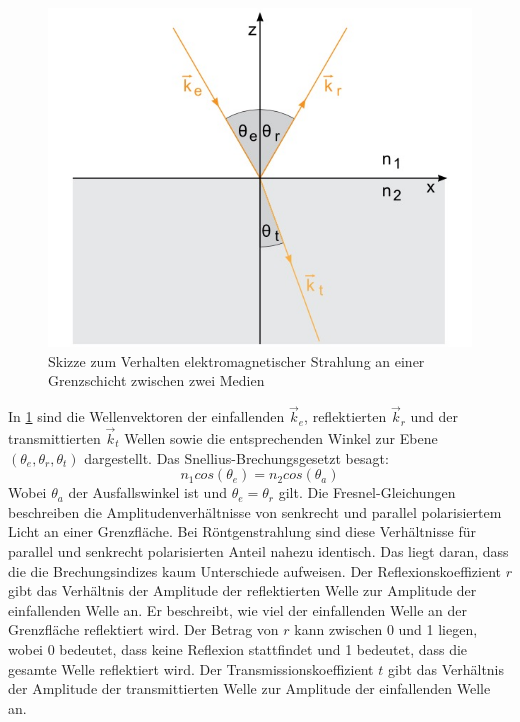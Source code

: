 \begin{figure}
    \includegraphics[width=\textwidth]{bilder/Reflexion.jpg}
    \caption{Skizze zum Verhalten elektromagnetischer Strahlung an einer Grenzschicht zwischen zwei Medien}
    \label{fig:Abbildung 2}
\end{figure}
In \ref{fig:Abbildung 2} sind die Wellenvektoren der einfallenden $\vec{k}_e$, reflektierten $\vec{k}_r$ und der
transmittierten $\vec{k}_t$ Wellen sowie die entsprechenden Winkel zur Ebene $(\theta_e,\theta_r,\theta_t)$ dargestellt.
Das Snellius-Brechungsgesetzt besagt:
\begin{equation}
    n_1cos(\theta_e)=n_2cos(\theta_a)
\end{equation}
Wobei $\theta_a$ der Ausfallswinkel ist und $\theta_e=\theta_r$ gilt.    
Die Fresnel-Gleichungen beschreiben die Amplitudenverhältnisse von senkrecht und parallel polarisiertem Licht
an einer Grenzfläche. Bei Röntgenstrahlung sind diese Verhältnisse für parallel und senkrecht polarisierten Anteil nahezu 
identisch. Das liegt daran, dass die die Brechungsindizes kaum Unterschiede aufweisen. 
Der Reflexionskoeffizient \(r\) gibt das Verhältnis der Amplitude der reflektierten Welle zur Amplitude der einfallenden Welle an. 
Er beschreibt, wie viel der einfallenden Welle an der Grenzfläche reflektiert wird. Der Betrag von \(r\) kann zwischen 0 und 1
liegen, wobei 0 bedeutet, dass keine Reflexion stattfindet und 1 bedeutet, dass die gesamte Welle reflektiert wird.
Der Transmissionskoeffizient \(t\) gibt das Verhältnis der Amplitude der transmittierten Welle zur Amplitude der einfallenden Welle an.
